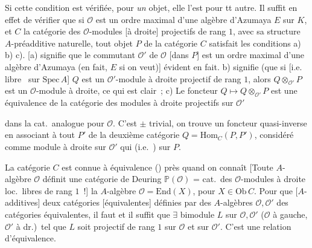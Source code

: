\documentclass[11pt,a4paper]{article}
\begin{document}
Si cette condition est vérifiée, \struck{\ill{}} pour \emph{un} objet, elle l'est pour tt autre. Il
suffit en effet de vérifier que si $\mathcal{O}$ est un ordre maximal d'une algèbre d'Azumaya $E$
sur $K$, et $C$ la catégorie des $\mathcal{O}$-modules [à droite] projectifs de rang $1$, avec sa
structure $A$-préadditive naturelle, tout objet $P$ de la catégorie $C$ satisfait les conditions
a) b) c). [a) signifie que le commutant $\mathcal{O}'$ de $\mathcal{O}$ [dans $P$] est
\struck{$\simeq$} un ordre maximal d'une algèbre d'Azumaya (en fait, $E$ si on veut)] évident en fait.
b) signifie (que si [i.e.\ \struck{\ill{}} libre \ sur $\mathrm{Spec}\, A$] $Q$ est un
$\mathcal{O}'$-module à droite projectif de rang $1$, alors $Q \otimes_{\mathcal{O}'} P$ est un
$\mathcal{O}$-module à droite, ce qui est clair~;
c) Le foncteur $Q \longmapsto Q \otimes_{\mathcal{O}'} P$ est une équivalence de la catégorie des
modules à droite projectifs sur $\mathcal{O}'$

dans la cat.\ analogue pour $\mathcal{O}$. C'est $\pm$ trivial, on trouve un foncteur quasi-inverse
en associant à tout $P'$ de la deuxième catégorie $Q = \mathrm{Hom}_{C}(P, P')$, considéré comme
module à droite sur $\mathcal{O}'$ qui \struck{\ill{}} (i.e.\ )  sur $P$.

La catégorie $C$ est connue \struck{\ill{}} à équivalence () près quand on connaît
\struck{\ill{}} [Toute $A$-algèbre $\mathcal{O}$ définit une catégorie de Deuring
$\mathbb{P}(\mathcal{O})$ = cat.\ des $\mathcal{O}$-modules à droite loc.\ libres de rang $1$~!]
la $A$-algèbre $\mathcal{O} = \mathrm{End}(X)$, pour $X \in \mathrm{Ob}\, C$. Pour que \struck{\ill{}}
[$A$-additives] deux catégories [équivalentes] \struck{\ill{}} définies par \struck{\ill{}} des
$A$-algèbres $\mathcal{O}, \mathcal{O}'$ \ill{} \struck{\ill{}} des catégories équivalentes, il faut et il
suffit que $\exists$ bimodule $L$ sur $\mathcal{O}, \mathcal{O}'$ ($\mathcal{O}$ à gauche, $\mathcal{O}'$
à dr.)\ tel que $L$ soit projectif de rang $1$ sur $\mathcal{O}$ et sur $\mathcal{O}'$. C'est une
relation d'équivalence. 
\end{document}
